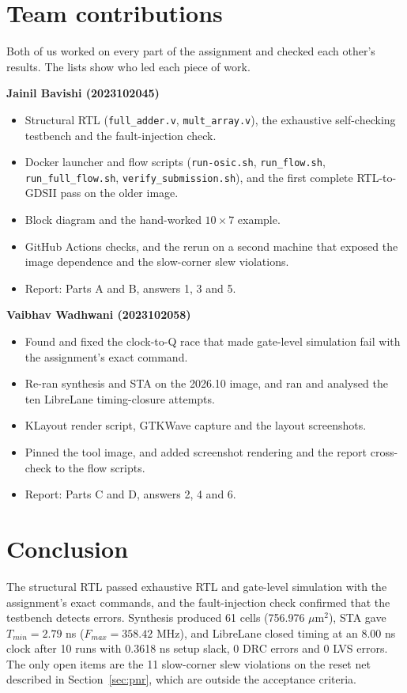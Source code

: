 \documentclass[10pt,a4paper]{article}
\newcommand{\code}[1]{\texttt{#1}}
\begin{document}
\section{Team contributions}
Both of us worked on every part of the assignment and checked each other's results. The lists show who led each piece of work.

\textbf{Jainil Bavishi (2023102045)}
\begin{itemize}[leftmargin=*,nosep]
\item Structural RTL (\code{full\_adder.v}, \code{mult\_array.v}), the exhaustive self-checking testbench and the fault-injection check.
\item Docker launcher and flow scripts (\code{run-osic.sh}, \code{run\_flow.sh}, \code{run\_full\_flow.sh}, \code{verify\_submission.sh}), and the first complete RTL-to-GDSII pass on the older image.
\item Block diagram and the hand-worked $10\times7$ example.
\item GitHub Actions checks, and the rerun on a second machine that exposed the image dependence and the slow-corner slew violations.
\item Report: Parts A and B, answers 1, 3 and 5.
\end{itemize}

\textbf{Vaibhav Wadhwani (2023102058)}
\begin{itemize}[leftmargin=*,nosep]
\item Found and fixed the clock-to-Q race that made gate-level simulation fail with the assignment's exact command.
\item Re-ran synthesis and STA on the 2026.10 image, and ran and analysed the ten LibreLane timing-closure attempts.
\item KLayout render script, GTKWave capture and the layout screenshots.
\item Pinned the tool image, and added screenshot rendering and the report cross-check to the flow scripts.
\item Report: Parts C and D, answers 2, 4 and 6.
\end{itemize}

\section{Conclusion}
The structural RTL passed exhaustive RTL and gate-level simulation with the assignment's exact commands, and the fault-injection check confirmed that the testbench detects errors. Synthesis produced 61 cells (756.976 $\mu$m$^2$), STA gave $T_{min}=2.79$ ns ($F_{max}=358.42$ MHz), and LibreLane closed timing at an 8.00 ns clock after 10 runs with 0.3618 ns setup slack, 0 DRC errors and 0 LVS errors. The only open items are the 11 slow-corner slew violations on the reset net described in Section~\ref{sec:pnr}, which are outside the acceptance criteria.
\end{document}
